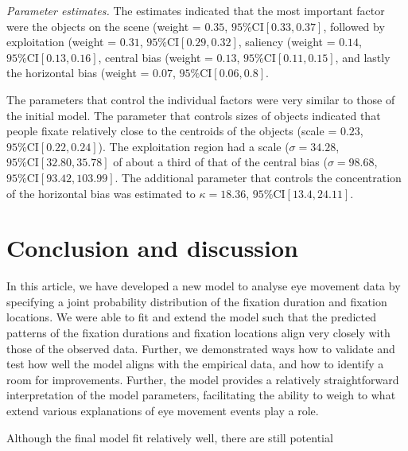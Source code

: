 \documentclass{article}
\begin{document}
\textit{Parameter estimates.} The estimates indicated that the most important factor were the objects on the scene (weight = $0.35$, $95\%\text{CI}[0.33, 0.37]$, followed by exploitation (weight = $0.31$, $95\%\text{CI}[0.29, 0.32]$, saliency (weight = $0.14$, $95\%\text{CI}[0.13, 0.16]$, central bias (weight = $0.13$, $95\%\text{CI}[0.11, 0.15]$, and lastly the horizontal bias (weight = $0.07$, $95\%\text{CI}[0.06, 0.8]$.

The parameters that control the individual factors were very similar to those of the initial model. The parameter that controls sizes of objects indicated that people fixate relatively close to the centroids of the objects (scale = $0.23$, $95\%\text{CI}[0.22, 0.24]$). The exploitation region had a scale ($\sigma = 34.28$, $95\%\text{CI}[32.80, 35.78]$ of about a third of that of the central bias ($\sigma=98.68$, $95\%\text{CI}[93.42, 103.99]$. The additional parameter that controls the concentration of the horizontal bias was estimated to $\kappa = 18.36$, $95\%\text{CI}[13.4,24.11]$.


\section{Conclusion and discussion}

In this article, we have developed a new model to analyse eye movement data by specifying a joint probability distribution of the fixation duration and fixation locations. We were able to fit and extend the model such that the predicted patterns of the fixation durations and fixation locations align very closely with those of the observed data. Further, we demonstrated ways how to validate and test how well the model aligns with the empirical data, and how to identify a room for improvements. Further, the model provides a relatively straightforward interpretation of the model parameters, facilitating the ability to weigh to what extend various explanations of eye movement events play a role.

Although the final model fit relatively well, there are still potential 



\end{document}
